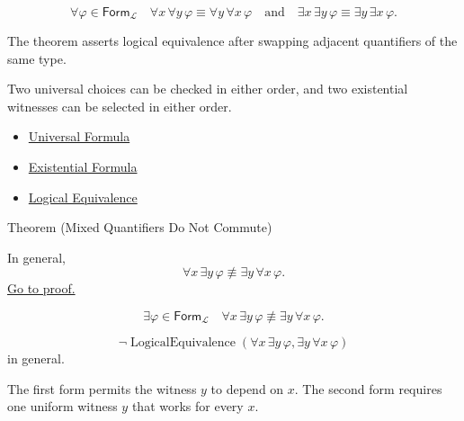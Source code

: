 \begin{remark*}
\[
\forall \varphi\in\mathsf{Form}_{\mathcal L}\quad
\forall x\,\forall y\,\varphi \equiv \forall y\,\forall x\,\varphi
\quad\text{and}\quad
\exists x\,\exists y\,\varphi \equiv \exists y\,\exists x\,\varphi.
\]
\end{remark*}



\begin{remark*}[Interpretation]
The theorem asserts logical equivalence after swapping adjacent quantifiers of
the same type.

Two universal choices can be checked in either order, and two existential
witnesses can be selected in either order.
\end{remark*}

\begin{dependencies}
\begin{itemize}
  \item \hyperref[def:universal-q]{Universal Formula}
  \item \hyperref[def:existential-q]{Existential Formula}
  \item \hyperref[def:log-equiv]{Logical Equivalence}
\end{itemize}
\end{dependencies}

\begin{theorembox}{Theorem (Mixed Quantifiers Do Not Commute)}
\begin{theorem}
\label{thm:mixed-quantifiers-do-not-commute}
In general,
\[
\forall x\,\exists y\,\varphi
\not\equiv
\exists y\,\forall x\,\varphi.
\]
\hyperref[prf:mixed-quantifiers-do-not-commute]{Go to proof.}
\end{theorem}
\end{theorembox}

\begin{remark*}
\[
\exists \varphi\in\mathsf{Form}_{\mathcal L}\quad
\forall x\,\exists y\,\varphi
\not\equiv
\exists y\,\forall x\,\varphi.
\]
\end{remark*}

\begin{remark*}
\[
\neg\operatorname{LogicalEquivalence}(\forall x\,\exists y\,\varphi,
\exists y\,\forall x\,\varphi)
\] in general.
\end{remark*}

\begin{remark*}[Interpretation]
The first form permits the witness \(y\) to depend on \(x\). The second form
requires one uniform witness \(y\) that works for every \(x\).
\end{remark*}

